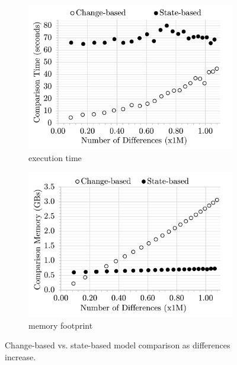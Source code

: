 \documentclass{jot}
\begin{document}
\begin{figure}[ht]
    \centering
    \begin{subfigure}[t]{0.495\linewidth}
        \includegraphics[width=\linewidth]{Time-Diffs}
        \caption{execution time}
        \label{fig:time_diffs}
    \end{subfigure}
    \hfill
    \begin{subfigure}[t]{0.495\linewidth}
        \includegraphics[width=\linewidth]{Memory-Diffs}
        \caption{memory footprint}
        \label{fig:memory_diffs}
    \end{subfigure}
    \caption{Change-based vs. state-based model comparison as differences increase.}
    \label{fig:change_vs_state}
\end{figure}
\end{document}
